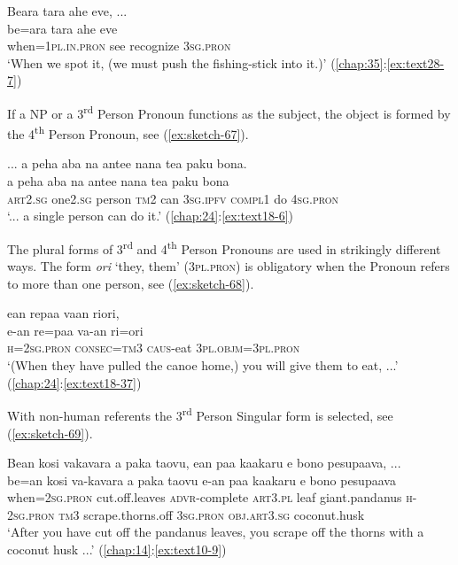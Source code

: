 \documentclass[output=paper]{langscibook}
\begin{document}
\ea\label{ex:sketch-66}
    Beara tara ahe eve, ...\\
    \gll be=ara	tara	ahe	eve\\
    when=1\textsc{pl}.\textsc{in}.\textsc{pron}	see	recognize	3\textsc{sg}.\textsc{pron}\\
    \glt `When we spot it, (we must push the fishing-stick into it.)' (\ref{chap:35}:\ref{ex:text28-7})
\z

If a NP or a 3\textsuperscript{rd} Person Pronoun functions as the subject, the object is formed by the 4\textsuperscript{th} Person Pronoun, see (\ref{ex:sketch-67}).

\ea\label{ex:sketch-67}
    ... a peha aba na antee nana tea paku bona.\\
    \gll a	peha	aba	na	antee	nana	tea	paku	bona\\
    \textsc{art}2.\textsc{sg}	one2.\textsc{sg}	person	\textsc{tm}2	can	3\textsc{sg}.\textsc{ipfv}	\textsc{compl}1	do	4\textsc{sg}.\textsc{pron}\\
    \glt `... a single person can do it.' (\ref{chap:24}:\ref{ex:text18-6})
\z

The plural forms of 3\textsuperscript{rd} and 4\textsuperscript{th} Person Pronouns are used in strikingly different ways. The form \textit{ori} `they, them' (3\textsc{pl}.\textsc{pron}) is obligatory when the Pronoun refers to more than one person, see (\ref{ex:sketch-68}).

\ea\label{ex:sketch-68}
    ean repaa vaan riori, \\
    \gll e-an	re=paa	va-an	ri=ori\\
    \textsc{h}=2\textsc{sg}.\textsc{pron}	\textsc{consec}=\textsc{tm}3	\textsc{caus}-eat	3\textsc{pl}.\textsc{objm}=3\textsc{pl}.\textsc{pron}\\
    \glt `(When they have pulled the canoe home,) you will give them to eat, ...' (\ref{chap:24}:\ref{ex:text18-37})
\z

With non-human referents the 3\textsuperscript{rd} Person Singular form is selected, see (\ref{ex:sketch-69}).

\ea\label{ex:sketch-69}
    Bean kosi vakavara a paka taovu, ean paa kaakaru e bono pesupaava, ...\\
    \gll be=an	kosi	va-kavara	a	paka	taovu	e-an	paa	kaakaru	e	bono	pesupaava\\
     when=2\textsc{sg}.\textsc{pron}	cut.off.leaves	\textsc{advr}-complete	\textsc{art}3.\textsc{pl}	leaf	giant.pandanus	\textsc{h}-2\textsc{sg}.\textsc{pron}	\textsc{tm}3	scrape.thorns.off	3\textsc{sg}.\textsc{pron}	\textsc{obj}.\textsc{art}3.\textsc{sg}	coconut.husk\\
    \glt `After you have cut off the pandanus leaves, you scrape off the thorns with a coconut husk ...' (\ref{chap:14}:\ref{ex:text10-9})
\z
\end{document}
